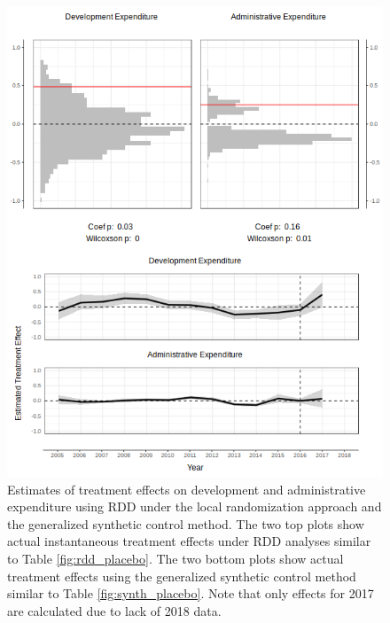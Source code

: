 \documentclass[12pt]{article}
\newcommand{\1}{\mathbbm{1}}
\begin{document}
\begin{figure}[!htbp]
	\centering
	\includegraphics[height=.75\textheight]{figure/190311_mech_results.png}
	\captionsetup{singlelinecheck=off}
	\caption[Estimated RDD and synthetic control treatment effects]{Estimates of treatment effects on development and administrative expenditure using RDD under the local randomization approach and the generalized synthetic control method. The two top plots show actual instantaneous treatment effects under RDD analyses similar to Table \ref{fig:rdd_placebo}. The two bottom plots show actual treatment effects using the generalized synthetic control method similar to Table \ref{fig:synth_placebo}. Note that only effects for 2017 are calculated due to lack of 2018 data.}
	\label{fig:synth_rdd_mech}
\end{figure}
\end{document}
